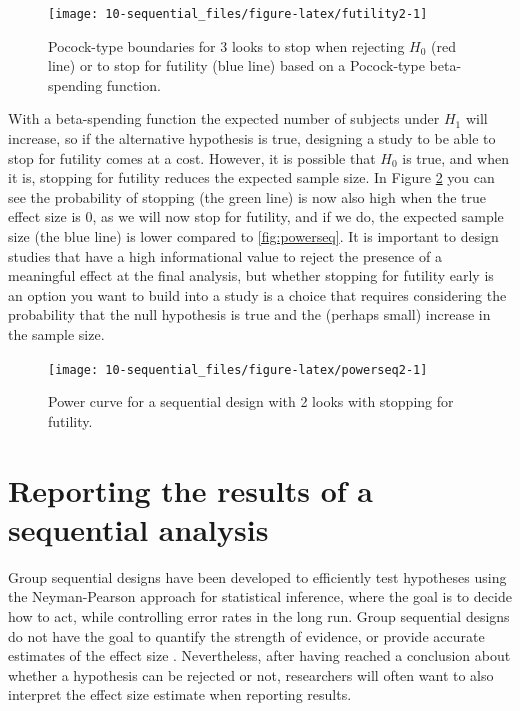\documentclass[
  oneside]{book}
\begin{document}
\begin{figure}

{\centering \texttt{[image: 10-sequential\_files/figure-latex/futility2-1]} 

}

\caption{Pocock-type boundaries for 3 looks to stop when rejecting \(H_0\) (red line) or to stop for futility (blue line) based on a Pocock-type beta-spending function.}\label{fig:futility2}
\end{figure}

With a beta-spending function the expected number of subjects under \(H_1\) will increase, so if the alternative hypothesis is true, designing a study to be able to stop for futility comes at a cost. However, it is possible that \(H_0\) is true, and when it is, stopping for futility reduces the expected sample size. In Figure \ref{fig:powerseq2} you can see the probability of stopping (the green line) is now also high when the true effect size is 0, as we will now stop for futility, and if we do, the expected sample size (the blue line) is lower compared to \ref{fig:powerseq}. It is important to design studies that have a high informational value to reject the presence of a meaningful effect at the final analysis, but whether stopping for futility early is an option you want to build into a study is a choice that requires considering the probability that the null hypothesis is true and the (perhaps small) increase in the sample size.



\begin{figure}

{\centering \texttt{[image: 10-sequential\_files/figure-latex/powerseq2-1]} 

}

\caption{Power curve for a sequential design with 2 looks with stopping for futility.}\label{fig:powerseq2}
\end{figure}

\hypertarget{reporting-the-results-of-a-sequential-analysis}{%
\section{Reporting the results of a sequential analysis}\label{reporting-the-results-of-a-sequential-analysis}}

Group sequential designs have been developed to efficiently test hypotheses using the Neyman-Pearson approach for statistical inference, where the goal is to decide how to act, while controlling error rates in the long run. Group sequential designs do not have the goal to quantify the strength of evidence, or provide accurate estimates of the effect size \citep{proschan_statistical_2006}. Nevertheless, after having reached a conclusion about whether a hypothesis can be rejected or not, researchers will often want to also interpret the effect size estimate when reporting results.
\end{document}
